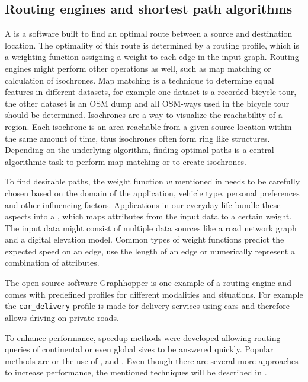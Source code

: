 	\subsection{Routing engines and shortest path algorithms}
	\label{subsec:routing-engines}
		
		A  is a software built to find an optimal route between a source and destination location.
		The optimality of this route is determined by a routing profile, which is a weighting function assigning a weight to each edge in the input graph.
		Routing engines might perform other operations as well, such as map matching or calculation of isochrones.
		Map matching is a technique to determine equal features in different datasets, for example one dataset is a recorded bicycle tour, the other dataset is an OSM dump and all OSM-ways used in the bicycle tour should be determined\cite{saki-map-matching}.
		Isochrones are a way to visualize the reachability of a region\cite{allen-isochrones}.
		Each isochrone is an area reachable from a given source location within the same amount of time, thus isochrones often form ring like structures.
		Depending on the underlying algorithm, finding optimal paths is a central algorithmic task to perform map matching or to create isochrones.
		
		To find desirable paths, the weight function $w$ mentioned in  needs to be carefully chosen based on the domain of the application, vehicle type, personal preferences and other influencing factors.
		Applications in our everyday life bundle these aspects into a , which maps attributes from the input data to a certain weight.
		The input data might consist of multiple data sources like a road network graph and a digital elevation model.
		Common types of weight functions predict the expected speed on an edge\cite{graphhopper-profile-bike-speeds}, use the length of an edge\cite{graphhopper-profile-shortest} or numerically represent a combination of attributes\cite{graphhopper-profile-short-fastest}.
		
		The open source software Graphhopper is one example of a routing engine and comes with predefined profiles for different modalities and situations.
		For example the \texttt{car\_delivery} profile is made for delivery services using cars and therefore allows driving on private roads\cite{graphhopper-routing-profiles}.
		
		To enhance performance, speedup methods were developed allowing routing queries of continental or even global sizes to be answered quickly.
		Popular methods are  or the use of ,  and .
		Even though there are several more approaches to increase performance, the mentioned techniques will be described in .
		
